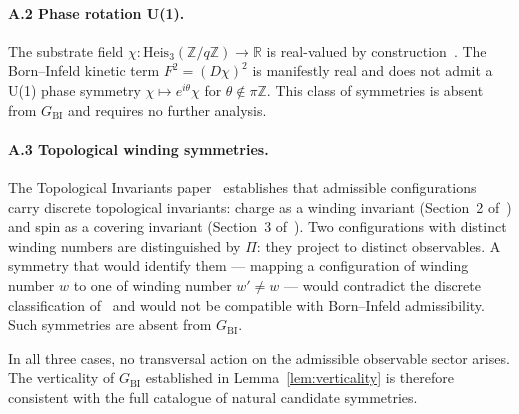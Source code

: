\documentclass[11pt,a4paper]{article}
\newcommand{\GBI}{G_{\mathrm{BI}}}
\begin{document}
  \paragraph{A.2 Phase rotation U(1).}
    The substrate field $\chi\colon \mathrm{Heis}_3(\mathbb{Z}/q\mathbb{Z}) \to \mathbb{R}$ is
    real-valued by construction~\cite{Cosmochrony}.
    The Born--Infeld kinetic term $F^2 = (D\chi)^2$ is manifestly real and does not admit a
    U(1) phase symmetry $\chi \mapsto e^{i\theta}\chi$ for $\theta \notin \pi\mathbb{Z}$.
    This class of symmetries is absent from $\GBI$ and requires no further analysis.

  \paragraph{A.3 Topological winding symmetries.}
    The Topological Invariants paper~\cite{Beau2026k} establishes that admissible configurations
    carry discrete topological invariants: charge as a winding invariant (Section~2 of~\cite{Beau2026k}) and spin as
    a covering invariant (Section~3 of~\cite{Beau2026k}).
    Two configurations with distinct winding numbers are distinguished by $\Pi$: they project to
    distinct observables.
    A symmetry that would identify them --- mapping a configuration of winding number $w$ to one
    of winding number $w' \neq w$ --- would contradict the discrete classification of~\cite{Beau2026k} and would not
    be compatible with Born--Infeld admissibility.
    Such symmetries are absent from $\GBI$.

    In all three cases, no transversal action on the admissible observable sector arises.
    The verticality of $\GBI$ established in Lemma~\ref{lem:verticality} is therefore consistent
    with the full catalogue of natural candidate symmetries.

    \clearpage
    
      
\end{document}
